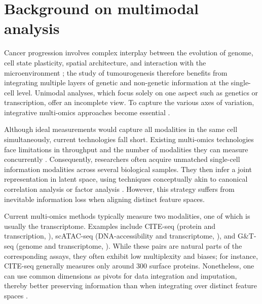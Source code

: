 \section{Background on multimodal analysis}

\label{sec:modalities-multimodal-intro}

Cancer progression involves complex interplay between the evolution of genome, cell state plasticity, spatial architecture, and interaction with the microenvironment ; the study of tumourogenesis therefore benefits from integrating multiple layers of genetic and non-genetic information at the single-cell level. Unimodal analyses, which focus solely on one aspect such as genetics or transcription, offer an incomplete view. To capture the various axes of variation, integrative multi-omics approaches become essential \parencite{Nam2021-xt,Baysoy2023-qr}.

Although ideal measurements would capture all modalities in the same cell simultaneously, current technologies fall short. Existing multi-omics technologies face limitations in throughput and the number of modalities they can measure concurrently \parencite{Baysoy2023-qr}. Consequently, researchers often acquire unmatched single-cell information modalities across several biological samples. They then infer a joint representation in latent space, using techniques conceptually akin to canonical correlation analysis \parencite{Stuart2019-mi} or factor analysis \parencite{Argelaguet2018-oz,Velten2022-gc}. However, this strategy suffers from inevitable information loss when aligning distinct feature spaces.

Current multi-omics methods typically measure two modalities, one of which is usually the transcriptome. Examples include CITE-seq (protein and transcription, \textcite{Stoeckius2017-rz}), scATAC-seq (DNA-accessibility and transcriptome, \textcite{Lareau2019-xr}), and G\&T-seq (genome and transcriptome, \textcite{Macaulay2015-gh}). While these pairs are natural parts of the corresponding assays, they often exhibit low multiplexity and biases; for instance, CITE-seq generally measures only around 300 surface proteins. Nonetheless, one can use common dimensions as pivots for data integration and imputation, thereby better preserving information than when integrating over distinct feature spaces \parencite{Hao2021-qn, Ashuach2023-wq}.

